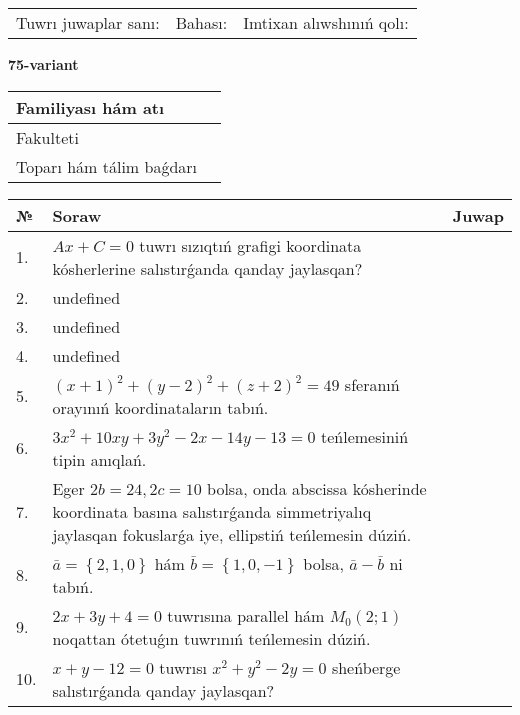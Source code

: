 \documentclass{article}
\begin{document}
\vspace{0.7cm}

\begin{tabular}{lll}
Tuwrı juwaplar sanı: \underline{\hspace{1cm}} & 
Bahası: \underline{\hspace{1cm}} & 
Imtixan alıwshınıń qolı: \underline{\hspace{2cm}} \\
\end{tabular}

\egroup

\newpage


\textbf{75-variant}\\

\bgroup
\def\arraystretch{1.6} %

\begin{tabular}{|m{5.7cm}|m{9.5cm}|}
\hline
Familiyası hám atı & \\
\hline
Fakulteti  & \\
\hline
Toparı hám tálim baǵdarı  & \\
\hline
\end{tabular}

\vspace{0.7cm}

\begin{tabular}{|m{0.7cm}|m{10cm}|m{4cm}|}
\hline
№ & Soraw & Juwap \\
\hline
1. & \(Ax + C = 0\) tuwrı sızıqtıń grafigi koordinata kósherlerine salıstırǵanda qanday jaylasqan? &  \\
\hline
2. & undefined &  \\
\hline
3. & undefined &  \\
\hline
4. & undefined &  \\
\hline
5. & \((x + 1) ^{2} + (y - 2) ^{2} + (z + 2) ^{2} = 49\) sferanıń orayınıń koordinataların tabıń. &  \\
\hline
6. & \(3 x^{2} + 10 xy + 3 y^{2} - 2 x - 14 y - 13 = 0\) teńlemesiniń tipin anıqlań. &  \\
\hline
7. & Eger \(2 b = 24, 2 c = 10\) bolsa, onda abscissa kósherinde koordinata basına salıstırǵanda simmetriyalıq jaylasqan fokuslarǵa iye, ellipstiń teńlemesin dúziń. &  \\
\hline
8. & \(\bar{a} = \left\{ 2, 1, 0 \right\}\) hám \(\bar{b} = \left\{ 1, 0,- 1 \right\}\) bolsa, \(\bar{a} - \bar{b}\) ni tabıń. &  \\
\hline
9. & \(2 x + 3 y + 4 = 0\) tuwrısına parallel hám \(M_{0} (2;1)\) noqattan ótetuǵın tuwrınıń teńlemesin dúziń. &  \\
\hline
10. & \(x + y - 12 = 0\) tuwrısı \(x^{2} + y^{2} - 2 y = 0\) sheńberge salıstırǵanda qanday jaylasqan? & \\
\hline
\end{tabular}
\end{document}
